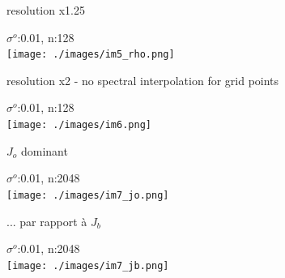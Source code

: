 \documentclass[francais]{beamer}
\begin{document}
\begin{frame}{resolution x1.25}
\begin{center}
$\sigma^o$:0.01, n:128\\
 \texttt{[image: ./images/im5\_rho.png]}
\end{center}
\end{frame}



\begin{frame}{resolution x2 - no spectral interpolation for grid points}
\begin{center}
$\sigma^o$:0.01, n:128\\
 \texttt{[image: ./images/im6.png]}
\end{center}
\end{frame}


\begin{frame}{$J_o$ dominant}
\begin{center}
$\sigma^o$:0.01, n:2048\\
 \texttt{[image: ./images/im7\_jo.png]}
\end{center}
\end{frame}


\begin{frame}{... par rapport à $J_b$}
\begin{center}
$\sigma^o$:0.01, n:2048\\
 \texttt{[image: ./images/im7\_jb.png]}
\end{center}
\end{frame}




\usebackgroundtemplate{}
\end{document}
